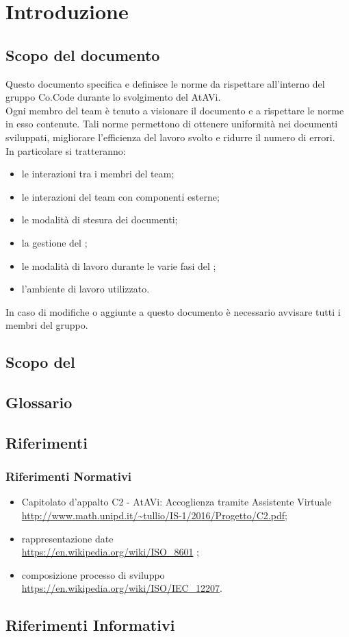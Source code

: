 \section{Introduzione}
	\subsection{Scopo del documento}
	Questo documento specifica e definisce le norme da rispettare all'interno del gruppo Co.Code durante lo svolgimento del  AtAVi. \\
	Ogni membro del team è tenuto a visionare il documento e a rispettare le norme in esso contenute. Tali norme permettono di ottenere uniformità nei documenti sviluppati,
	migliorare l'efficienza del lavoro svolto e ridurre il numero di errori. \\
	In particolare si tratteranno:
	\begin{itemize}
		\item le interazioni tra i membri del team;
		\item le interazioni del team con componenti esterne;
		\item le modalità di stesura dei documenti;
		\item la gestione del ;
		\item le modalità di lavoro durante le varie fasi del ;
		\item l'ambiente di lavoro utilizzato.
	\end{itemize}
	In caso di modifiche o aggiunte a questo documento è necessario avvisare tutti i membri del gruppo.
	\subsection{Scopo del }
		\SCOPO
	\subsection{Glossario}
		\GLOSSARIO
	\subsection{Riferimenti}
		\subsubsection{Riferimenti Normativi}
		\begin{itemize}
		\item Capitolato d'appalto C2 - AtAVi: Accoglienza tramite Assistente Virtuale \\
		\url{http://www.math.unipd.it/~tullio/IS-1/2016/Progetto/C2.pdf};
		\item rappresentazione date \\
		\url{https://en.wikipedia.org/wiki/ISO_8601}	;
		\item composizione processo di sviluppo \\
		\url{https://en.wikipedia.org/wiki/ISO/IEC_12207}.	
			
	\end{itemize}
	    \subsection{Riferimenti Informativi}
	     